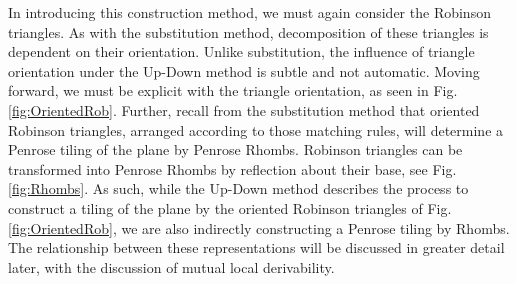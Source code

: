 \documentclass[
  oneside,
  11pt, a4paper,
  footinclude=true,
  headinclude=true,
  cleardoublepage=empty
]{scrbook}
\begin{document}
In introducing this construction method, we must again consider the Robinson triangles. As with the substitution method, decomposition of these triangles is dependent on their orientation. Unlike substitution, the influence of triangle orientation under the Up-Down method is subtle and not automatic. Moving forward, we must be explicit with the triangle orientation, as seen in Fig.\ref{fig:OrientedRob}. Further, recall from the substitution method that oriented Robinson triangles, arranged according to those matching rules, will determine a Penrose tiling of the plane by Penrose Rhombs. Robinson triangles can be transformed into Penrose Rhombs by reflection about their base, see Fig.\ref{fig:Rhombs}. As such, while the Up-Down method describes the process to construct a tiling of the plane by the oriented Robinson triangles of Fig.\ref{fig:OrientedRob}, we are also indirectly constructing a Penrose tiling by Rhombs. The relationship between these representations will be discussed in greater detail later, with the discussion of mutual local derivability. 
\end{document}
